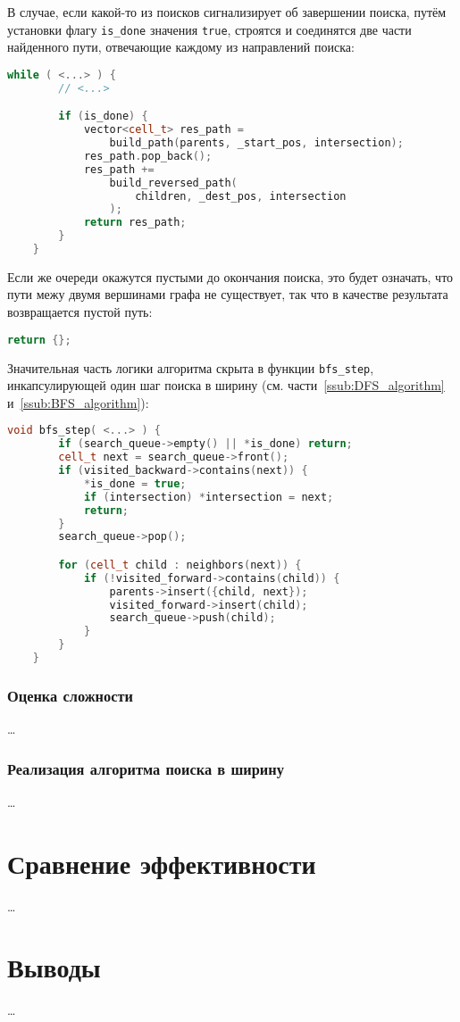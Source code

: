 \documentclass[a4paper, 12pt]{article}
\begin{document}
В случае, если какой-то из поисков сигнализирует об завершении поиска, путём установки флагу \verb|is_done| значения \verb|true|, строятся и соединятся две части найденного пути, отвечающие каждому из направлений поиска:
\begin{lstlisting}[language=C++]
    while ( <...> ) {
        // <...>

        if (is_done) {
            vector<cell_t> res_path =
                build_path(parents, _start_pos, intersection);
            res_path.pop_back();
            res_path +=
                build_reversed_path(
                    children, _dest_pos, intersection
                );
            return res_path;
        }
    }
\end{lstlisting}

Если же очереди окажутся пустыми до окончания поиска, это будет означать, что пути межу двумя вершинами графа не существует, так что в качестве результата возвращается пустой путь:
\begin{lstlisting}[language=C++]
    return {};
\end{lstlisting}

Значительная часть логики алгоритма скрыта в функции \verb|bfs_step|, инкапсулирующей один шаг поиска в ширину (см. части~\ref{ssub:DFS_algorithm} и~\ref{ssub:BFS_algorithm}):
\begin{lstlisting}[language=C++]
    void bfs_step( <...> ) {
        if (search_queue->empty() || *is_done) return;
        cell_t next = search_queue->front();
        if (visited_backward->contains(next)) {
            *is_done = true;
            if (intersection) *intersection = next;
            return;
        }
        search_queue->pop();

        for (cell_t child : neighbors(next)) {
            if (!visited_forward->contains(child)) {
                parents->insert({child, next});
                visited_forward->insert(child);
                search_queue->push(child);
            }
        }
    }
\end{lstlisting}

\subsubsection{Оценка сложности}
\ldots

\subsubsection{Реализация алгоритма поиска в ширину}
\label{ssub:BFS_implementation}
\ldots

\section{Сравнение эффективности}
\ldots

\section{Выводы}
\ldots
\end{document}
